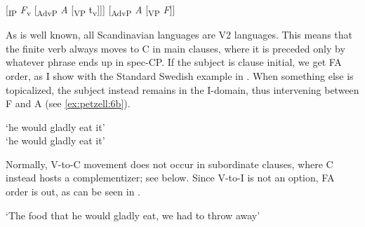\documentclass[output=paper,colorlinks,citecolor=brown,draft,draftmode]{langscibook}
\begin{document}
\ea\label{ex:petzell:5}
\ea\label{ex:petzell:5a}
[\textsubscript{IP} \textit{F}\textsubscript{v} [\textsubscript{AdvP} \textit{A} [\textsubscript{VP} t\textsubscript{v}]]]                      
\ex\label{ex:petzell:5b}{}  [\textsubscript{AdvP} \textit{A} [\textsubscript{VP} \textit{F}]]                        
\z
\z


As is well known, all Scandinavian languages are V2 languages. This means that the finite verb always moves to C in main clauses, where it is preceded only by whatever phrase ends up in spec-CP. If the subject is clause initial, we get FA order, as I show with the Standard Swedish example in . When something else is topicalized, the subject instead remains in the I-domain, thus intervening between F and A (see \ref{ex:petzell:6b}).


\ea\label{ex:petzell:6}
\glt `he would gladly eat it’  \\
\glt `he would gladly eat it’
\z
\z


Normally, V-to-C movement does not occur in subordinate clauses, where C instead hosts a complementizer; see  below. Since V-to-I is not an option, FA order is out, as can be seen in .


\ea\label{ex:petzell:7}
\glt `The food that he would gladly eat, we had to throw away’
\end{document}
